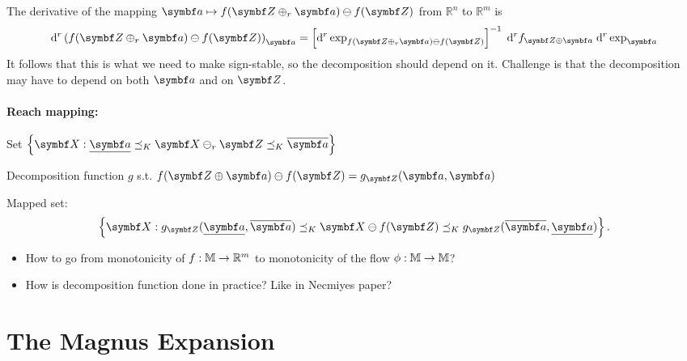 The derivative of the mapping $\a \mapsto f(\Z \oplus_r \a) \ominus f(\Z)$ from $\mathbb{R}^n$ to $\mathbb{R}^m$ is
\begin{equation}
  \mathrm{d}^r \left( f(\Z \oplus_r \a) \ominus f(\Z) \right)_\a = \left[ \mathrm{d}^r \exp_{f(\Z \oplus_r \a) \ominus f(\Z)} \right]^{-1} \; \mathrm{d}^r f_{\Z \oplus \a} \; \mathrm{d}^r \exp_\a
\end{equation}
It follows that this is what we need to make sign-stable, so the decomposition should depend on it. Challenge is that the decomposition may have to depend on both $\a$ and on $\Z$.

\paragraph{Reach mapping:}

Set $\left\{ \X : \underline \a \preceq_K \X \ominus_r \Z \preceq_K \overline \a \right\}$

Decomposition function $g$ s.t. $f(\Z \oplus \a) \ominus f(\Z) = g_{\Z}(\a, \a)$

Mapped set:
\begin{equation}
  \left\{ \X : g_\Z(\underline \a, \overline \a) \preceq_K \X \ominus f(\Z) \preceq_K g_\Z(\overline \a, \underline \a) \right\}.
\end{equation}

\begin{itemize}
  \item How to go from monotonicity of $f : {\mathbb{M}} \rightarrow \mathbb{R}^m$ to monotonicity of the flow $\phi : {\mathbb{M}} \rightarrow {\mathbb{M}}$?
  \item How is decomposition function done in practice? Like in Necmiyes paper?
\end{itemize}

\section{The Magnus Expansion}

